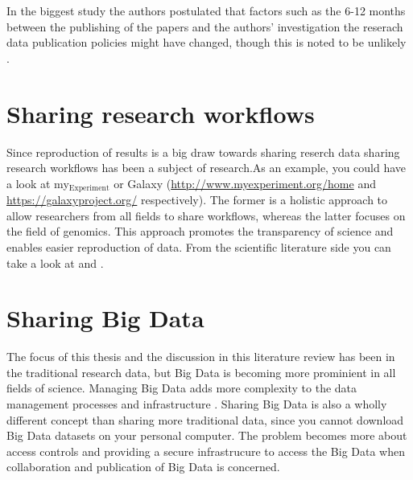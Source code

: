 In the biggest study the authors postulated that factors such as the 6-12
months between the publishing of the papers and the authors' investigation
the reserach data publication policies might have changed, though this is noted
to be unlikely \cite{alsheikh2011public}.

\section{Sharing research workflows}

Since reproduction of results is a big draw towards sharing reserch data
sharing research workflows has been a subject of research.As an example, you
could have a look at my\({}_{\mbox{Experiment}}\) or Galaxy 
(\url{http://www.myexperiment.org/home} and \url{https://galaxyproject.org/}
respectively). The former is a holistic approach to allow researchers from all
fields to share workflows, whereas the latter focuses on the field of genomics.
This approach promotes the transparency of science and enables
easier reproduction of data. From the scientific literature side you can take
a look at \cite{goecks2010galaxy} and \cite{DBLP:journals/fgcs/RoureGS09}.

\section{Sharing Big Data}

The focus of this thesis and the discussion in this literature review has been
in the traditional research data, but Big Data is becoming more prominient in
all fields of science. Managing Big Data adds more complexity to the data
management processes and infrastructure
\cite{DBLP:conf/cloudcom/DemchenkoZGWL12}. Sharing Big Data is also a wholly
different concept than sharing more traditional data, since you cannot download
Big Data datasets on your personal computer. The problem becomes more about
access controls and providing a secure infrastrucure to access the Big Data
when collaboration and publication of Big Data is concerned.

